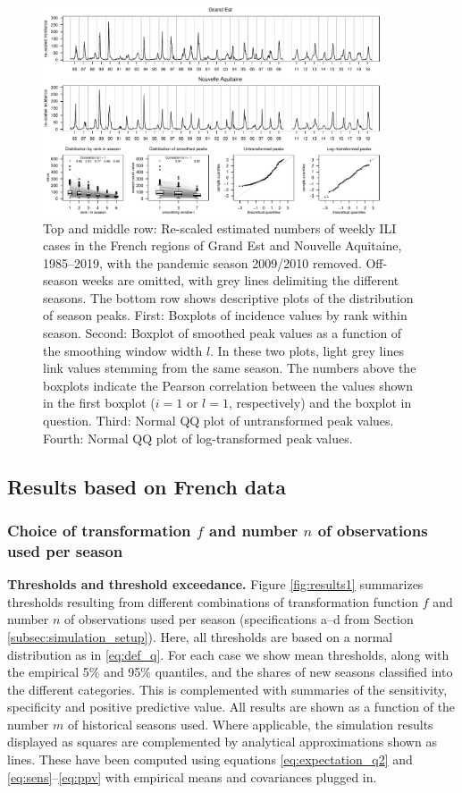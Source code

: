 \documentclass[12pt]{article}
\begin{document}
\begin{figure}[h]
\center
\includegraphics[width=0.9\textwidth]{figure/plot_data_fr.pdf}
\caption{Top and middle row: Re-scaled estimated numbers of weekly ILI cases in the French regions of Grand Est and Nouvelle Aquitaine, 1985--2019, with the pandemic season 2009/2010 removed. Off-season weeks are omitted, with grey lines delimiting the different seasons. The bottom row shows descriptive plots of the distribution of season peaks. First: Boxplots of incidence values by rank within season. Second: Boxplot of smoothed peak values as a function of the smoothing window width $l$. In these two plots, light grey lines link values stemming from the same season. The numbers above the boxplots indicate the Pearson correlation between the values shown in the first boxplot ($i = 1$ or $l = 1$, respectively) and the boxplot in question. Third: Normal QQ plot of untransformed peak values. Fourth: Normal QQ plot of log-transformed peak values.}
\label{fig:data}
\end{figure}

\subsection{Results based on French data}

\subsubsection{Choice of transformation $f$ and number $n$ of observations used per season}
\label{subsubsec:n}

\textbf{Thresholds and threshold exceedance.} Figure \ref{fig:results1} summarizes thresholds resulting from different combinations of transformation function $f$ and number $n$ of observations used per season (specifications a--d from Section \ref{subsec:simulation_setup}). Here, all thresholds are based on a normal distribution as in \eqref{eq:def_q}. For each case we show mean thresholds, along with the empirical 5\% and 95\% quantiles, and the shares of new seasons classified into the different categories. This is complemented with summaries of the sensitivity, specificity and positive predictive value. All results are shown as a function of the number $m$ of historical seasons used. Where applicable, the simulation results displayed as squares are complemented by analytical approximations shown as lines. These have been computed using equations \eqref{eq:expectation_q2} and \eqref{eq:sens}--\eqref{eq:ppv} with empirical means and covariances plugged in.
\end{document}
